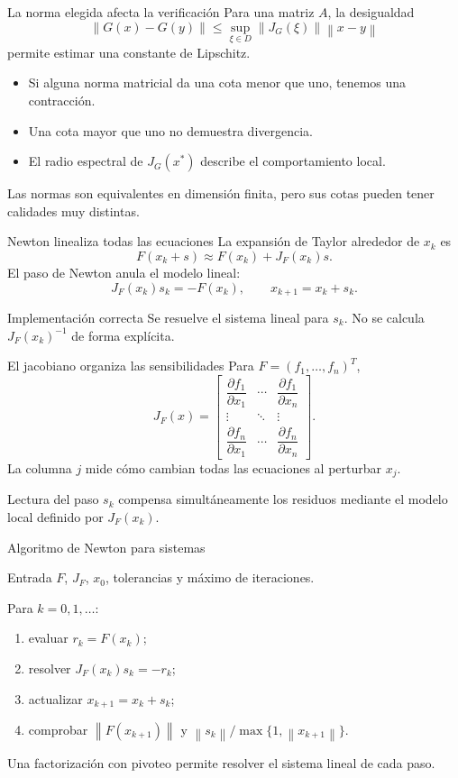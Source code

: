 \documentclass[aspectratio=169,12pt]{beamer}
\newcommand{\mat}[1]{\begin{bmatrix}#1\end{bmatrix}}
\newcommand{\norm}[1]{\left\lVert#1\right\rVert}
\begin{document}
\begin{frame}{La norma elegida afecta la verificación}
Para una matriz $A$, la desigualdad
\[
\norm{G(x)-G(y)}\leq
\sup_{\xi\in D}\norm{J_G(\xi)}\norm{x-y}
\]
permite estimar una constante de Lipschitz.
\begin{itemize}
  \item Si alguna norma matricial da una cota menor que uno, tenemos una contracción.
  \item Una cota mayor que uno no demuestra divergencia.
  \item El radio espectral de $J_G(x^*)$ describe el comportamiento local.
\end{itemize}
Las normas son equivalentes en dimensión finita, pero sus cotas pueden tener
calidades muy distintas.
\end{frame}

\begin{frame}{Newton linealiza todas las ecuaciones}
La expansión de Taylor alrededor de $x_k$ es
\[
F(x_k+s)\approx F(x_k)+J_F(x_k)s.
\]
El paso de Newton anula el modelo lineal:
\[
J_F(x_k)s_k=-F(x_k),
\qquad
x_{k+1}=x_k+s_k.
\]
\begin{block}{Implementación correcta}
Se resuelve el sistema lineal para $s_k$. No se calcula $J_F(x_k)^{-1}$ de forma explícita.
\end{block}
\end{frame}

\begin{frame}{El jacobiano organiza las sensibilidades}
Para $F=(f_1,\ldots,f_n)^T$,
\[
J_F(x)=
\mat{
\dfrac{\partial f_1}{\partial x_1} & \cdots & \dfrac{\partial f_1}{\partial x_n}\\[2mm]
\vdots & \ddots & \vdots\\[1mm]
\dfrac{\partial f_n}{\partial x_1} & \cdots & \dfrac{\partial f_n}{\partial x_n}
}.
\]
La columna $j$ mide cómo cambian todas las ecuaciones al perturbar $x_j$.
\begin{block}{Lectura del paso}
$s_k$ compensa simultáneamente los residuos mediante el modelo local definido por $J_F(x_k)$.
\end{block}
\end{frame}

\begin{frame}{Algoritmo de Newton para sistemas}
\begin{block}{Entrada}
$F$, $J_F$, $x_0$, tolerancias y máximo de iteraciones.
\end{block}
Para $k=0,1,\ldots$:
\begin{enumerate}
  \item evaluar $r_k=F(x_k)$;
  \item resolver $J_F(x_k)s_k=-r_k$;
  \item actualizar $x_{k+1}=x_k+s_k$;
  \item comprobar $\norm{F(x_{k+1})}$ y $\norm{s_k}/\max\{1,\norm{x_{k+1}}\}$.
\end{enumerate}
Una factorización con pivoteo permite resolver el sistema lineal de cada paso.
\end{frame}
\end{document}
